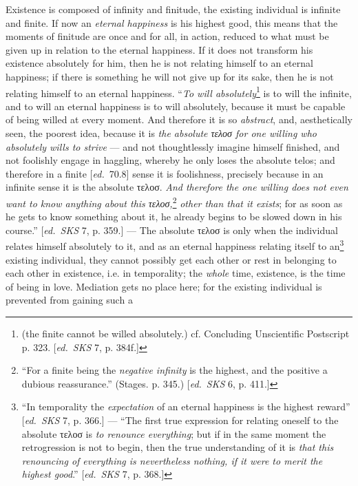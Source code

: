 \documentclass[12pt,a4paper,openany]{book}
\newcommand{\kpage}[1]{\marginnote{\footnotesize\textit{[#1]}}}
\newcommand{\ed}[1]{{\small[\textit{ed.}\ #1]}}
\begin{document}
Existence is composed of infinity and finitude, the existing individual
is infinite and finite. If now an \emph{eternal happiness} is his highest\kpage{138}
good, this means that the moments of finitude are once
and for all, in action, reduced to what must be given up in relation
to the eternal happiness. If it does not transform his existence absolutely for him,
then he is not relating himself to an eternal happiness; if there is something
he will not give up for its sake, then he is not relating himself to an
eternal happiness. ``\emph{To will absolutely}\footnote[69]{
(the finite cannot be willed absolutely.) cf. Concluding Unscientific Postscript
p. 323. \ed{\emph{SKS} 7, p. 384f.}}
is to will the infinite, and to will
an eternal happiness is to will absolutely, because it must be capable of being willed at every
moment. And therefore it is so \emph{abstract}, and, aesthetically seen, the
poorest idea, because it is \emph{the absolute τελοσ for one willing who
absolutely wills to strive} --- and not thoughtlessly imagine himself finished, and
not foolishly engage in haggling, whereby he only loses the
absolute telos; and therefore in a finite \ed{70.8} sense it is foolishness,
precisely because in an infinite sense it is the absolute τελοσ. \emph{And
therefore the one willing does not even want to know anything about this τελοσ,}\footnote[70]{
``For a finite being the \emph{negative infinity} is the highest, and the positive a
dubious reassurance.'' (Stages. p. 345.) \ed{\emph{SKS} 6, p. 411.}}
\emph{other than that
it exists}; for as soon as he gets to know something about it, he already begins
to be slowed down in his course.'' \ed{\emph{SKS} 7, p. 359.} --- The absolute τελοσ is
only when the individual relates himself absolutely to it, and as an eternal
happiness relating itself to an\footnote[71]{
``In temporality the \emph{expectation} of an eternal happiness is the highest reward'' \ed{\emph{SKS} 7, p.
366.} --- ``The first true expression for relating oneself to the absolute τελοσ is \emph{to renounce
everything}; but if in the same moment the retrogression is not to begin, then the true
understanding of it is \emph{that this renouncing of everything is nevertheless nothing, if it were to merit the highest good}.''
\ed{\emph{SKS} 7, p. 368.}}
existing individual, they cannot possibly get
each other or rest in belonging to each other in existence, i.e. in temporality;
the \emph{whole} time, existence, is the time of being in love. Mediation gets
no place here; for the existing individual is prevented from gaining such a
\end{document}
